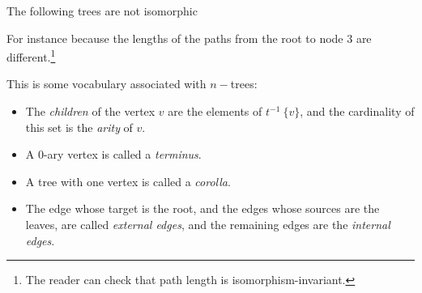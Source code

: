 %

\begin{exl}
	The following trees are not isomorphic


	For instance because the lengths of the paths from the root to node 3 are
	different.\footnote{The reader can check that path length is
		isomorphism-invariant.}
\end{exl}

\begin{defn}\label{tree-v}
	This is some vocabulary associated with $n-$trees:
	\begin{itemize}
		\item The \emph{children} of the vertex $v$ are the
			elements of $t^{-1} \ \{ v \}$, and the cardinality
			of this set is the \emph{arity} of $v$.
		\item A 0-ary vertex is called a \emph{terminus}.
		\item A tree with one vertex is called a \emph{corolla}.
		\item The edge whose target is the root, and the edges
			whose sources are the leaves, are called
			\emph{external edges}, and the remaining edges are
			the \emph{internal edges}.
	\end{itemize}
\end{defn}

